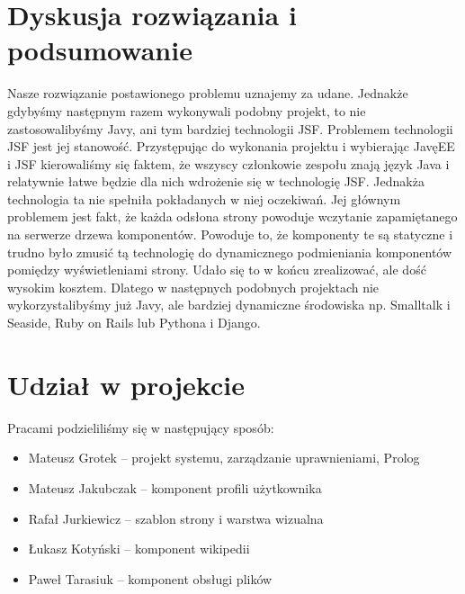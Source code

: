 \documentclass{classrep}
\begin{document}
\section{Dyskusja rozwiązania i podsumowanie}
Nasze rozwiązanie postawionego problemu uznajemy za udane. Jednakże gdybyśmy następnym razem wykonywali podobny projekt, to nie zastosowalibyśmy Javy, ani tym bardziej technologii JSF.
Problemem technologii JSF jest jej stanowość. Przystępując do wykonania projektu i wybierając JavęEE i JSF kierowaliśmy się faktem, że wszyscy członkowie zespołu znają język Java 
i relatywnie łatwe będzie dla nich wdrożenie się w technologię JSF. Jednakża technologia ta nie spełniła pokładanych w niej oczekiwań. Jej głównym problemem jest fakt,
że każda odsłona strony powoduje wczytanie zapamiętanego na serwerze drzewa komponentów. Powoduje to, że komponenty te są statyczne i trudno było zmusić tą technologię do
dynamicznego podmieniania komponentów pomiędzy wyświetleniami strony. Udało się to w końcu zrealizować, ale dość wysokim kosztem. Dlatego w następnych podobnych projektach
nie wykorzystalibyśmy już Javy, ale bardziej dynamiczne środowiska np. Smalltalk i Seaside, Ruby on Rails lub Pythona i Django. 
\section{Udział w projekcie}
Pracami podzieliliśmy się w następujący sposób:
\begin{itemize}
\item Mateusz Grotek -- projekt systemu, zarządzanie uprawnieniami, Prolog
\item Mateusz Jakubczak -- komponent profili użytkownika
\item Rafał Jurkiewicz -- szablon strony i warstwa wizualna
\item Łukasz Kotyński -- komponent wikipedii
\item Paweł Tarasiuk -- komponent obsługi plików
\end{itemize}
\end{document}

